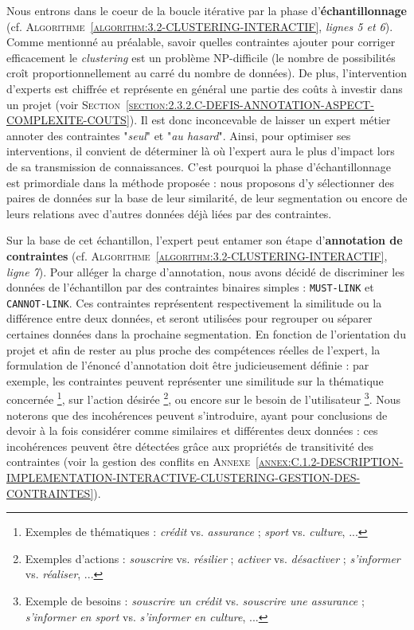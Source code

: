 		Nous entrons dans le coeur de la boucle itérative par la phase d'\textbf{échantillonnage} (cf. \textsc{Algorithme~\ref{algorithm:3.2-CLUSTERING-INTERACTIF}}, \textit{lignes 5 et 6}).
		Comme mentionné au préalable, savoir quelles contraintes ajouter pour corriger efficacement le \textit{clustering} est un problème NP-difficile (le nombre de possibilités croît proportionnellement au carré du nombre de données).
		De plus, l'intervention d'experts est chiffrée et représente en général une partie des coûts à investir dans un projet (voir \textsc{Section~\ref{section:2.3.2.C-DEFIS-ANNOTATION-ASPECT-COMPLEXITE-COUTS}}).
		Il est donc inconcevable de laisser un expert métier annoter des contraintes "\textit{seul}" et "\textit{au hasard}".
		Ainsi, pour optimiser ses interventions, il convient de déterminer là où l'expert aura le plus d'impact lors de sa transmission de connaissances.
		C'est pourquoi la phase d'échantillonnage est primordiale dans la méthode proposée : nous proposons d'y sélectionner des paires de données sur la base de leur similarité, de leur segmentation ou encore de leurs relations avec d'autres données déjà liées par des contraintes.
		
		Sur la base de cet échantillon, l'expert peut entamer son étape d'\textbf{annotation de contraintes} (cf. \textsc{Algorithme~\ref{algorithm:3.2-CLUSTERING-INTERACTIF}}, \textit{ligne 7}).
		Pour alléger la charge d'annotation, nous avons décidé de discriminer les données de l'échantillon par des contraintes binaires simples : \texttt{MUST-LINK} et \texttt{CANNOT-LINK}.
		Ces contraintes représentent respectivement la similitude ou la différence entre deux données, et seront utilisées pour regrouper ou séparer certaines données dans la prochaine segmentation.
		En fonction de l'orientation du projet et afin de rester au plus proche des compétences réelles de l'expert, la formulation de l'énoncé d'annotation doit être judicieusement définie : par exemple, les contraintes peuvent représenter une similitude
		sur la thématique concernée \footnote{
			Exemples de thématiques : \textit{crédit} vs. \textit{assurance} ; \textit{sport} vs. \textit{culture}, ...
		}, sur l'action désirée \footnote{
			Exemples d'actions : \textit{souscrire} vs. \textit{résilier} ; \textit{activer} vs. \textit{désactiver} ; \textit{s'informer} vs. \textit{réaliser}, ...
		}, ou encore sur le besoin de l'utilisateur \footnote{
			Exemple de besoins : \textit{souscrire un crédit} vs. \textit{souscrire une assurance} ; \textit{s'informer en sport} vs. \textit{s'informer en culture}, ...
		}.
		Nous noterons que des incohérences peuvent s'introduire, ayant pour conclusions de devoir à la fois considérer comme similaires et différentes deux données : ces incohérences peuvent être détectées grâce aux propriétés de transitivité des contraintes (voir la gestion des conflits en \textsc{Annexe~\ref{annex:C.1.2-DESCRIPTION-IMPLEMENTATION-INTERACTIVE-CLUSTERING-GESTION-DES-CONTRAINTES}}).
		
